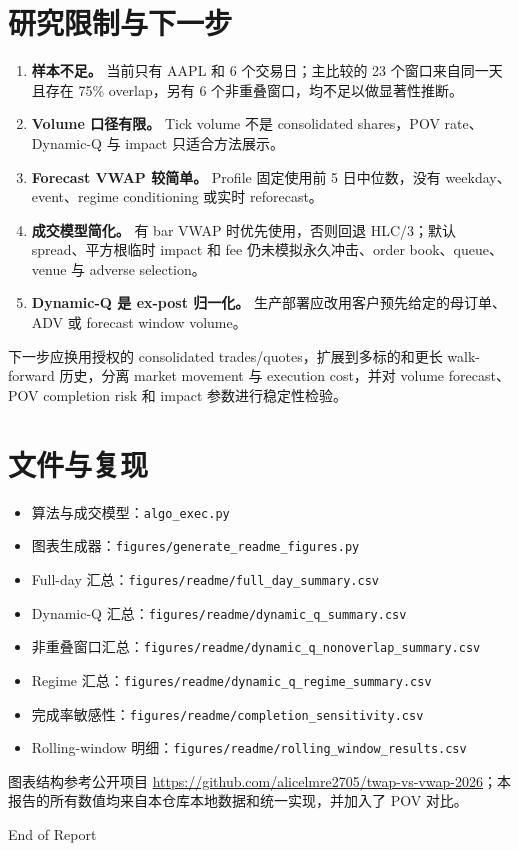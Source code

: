 \documentclass[11pt,a4paper,fontset=fandol]{ctexart}
\begin{document}
\section{研究限制与下一步}

\begin{enumerate}
  \item \textbf{样本不足。} 当前只有 AAPL 和 6 个交易日；主比较的 23 个窗口来自同一天且存在 75\% overlap，另有 6 个非重叠窗口，均不足以做显著性推断。
  \item \textbf{Volume 口径有限。} Tick volume 不是 consolidated shares，POV rate、Dynamic-Q 与 impact 只适合方法展示。
  \item \textbf{Forecast VWAP 较简单。} Profile 固定使用前 5 日中位数，没有 weekday、event、regime conditioning 或实时 reforecast。
  \item \textbf{成交模型简化。} 有 bar VWAP 时优先使用，否则回退 HLC/3；默认 spread、平方根临时 impact 和 fee 仍未模拟永久冲击、order book、queue、venue 与 adverse selection。
  \item \textbf{Dynamic-Q 是 ex-post 归一化。} 生产部署应改用客户预先给定的母订单、ADV 或 forecast window volume。
\end{enumerate}

下一步应换用授权的 consolidated trades/quotes，扩展到多标的和更长 walk-forward 历史，分离 market movement 与 execution cost，并对 volume forecast、POV completion risk 和 impact 参数进行稳定性检验。

\section*{文件与复现}

\begin{itemize}
  \item 算法与成交模型：\texttt{algo\_exec.py}
  \item 图表生成器：\texttt{figures/generate\_readme\_figures.py}
  \item Full-day 汇总：\texttt{figures/readme/full\_day\_summary.csv}
  \item Dynamic-Q 汇总：\texttt{figures/readme/dynamic\_q\_summary.csv}
  \item 非重叠窗口汇总：\texttt{figures/readme/dynamic\_q\_nonoverlap\_summary.csv}
  \item Regime 汇总：\texttt{figures/readme/dynamic\_q\_regime\_summary.csv}
  \item 完成率敏感性：\texttt{figures/readme/completion\_sensitivity.csv}
  \item Rolling-window 明细：\texttt{figures/readme/rolling\_window\_results.csv}
\end{itemize}

图表结构参考公开项目 \url{https://github.com/alicelmre2705/twap-vs-vwap-2026}；本报告的所有数值均来自本仓库本地数据和统一实现，并加入了 POV 对比。

\vfill
\begin{center}
  {\small\color{darkgray}End of Report}
\end{center}
\end{document}
